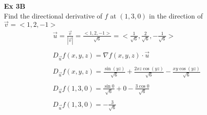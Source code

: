 \documentclass{article}
\begin{document}
    \textbf{Ex 3B}\\
    Find the directional derivative of $ f $ at $ (1,3,0) $ in the direction of $ \vec{v}=< 1, 2, -1 >  $
    \[
        \begin{gathered}
        \vec{u}=\frac{\vec{v}}{| \vec{v} |}= \frac{< 1, 2, -1 > }{\sqrt{6}}= < \frac{1}{\sqrt{6} } , \frac{2}{\sqrt{6} } , -\frac{1}{\sqrt{6} }  >  \\
        ~\\
        D_{\vec{u}}f(x,y,z)= \nabla f(x,y,z) \cdot \vec{u}\\
        ~\\
        D_{\vec{u}}f(x,y,z) = \frac{\sin{(yz)}}{\sqrt{6} } + \frac{2xz\cos{(yz)}}{\sqrt{6} }-\frac{xy\cos{(yz)}}{\sqrt{6}}\\
        ~\\
        D_{\vec{u}}f(1,3,0) = \frac{\sin{0}}{\sqrt{6} }+ 0 - \frac{3\cos{0}}{\sqrt{6}}\\
        ~\\
        \boxed{D_{\vec{u}}f(1,3,0) =  -\frac{3}{\sqrt{6}}} 
        \end{gathered}
    \]
    
\end{document}
